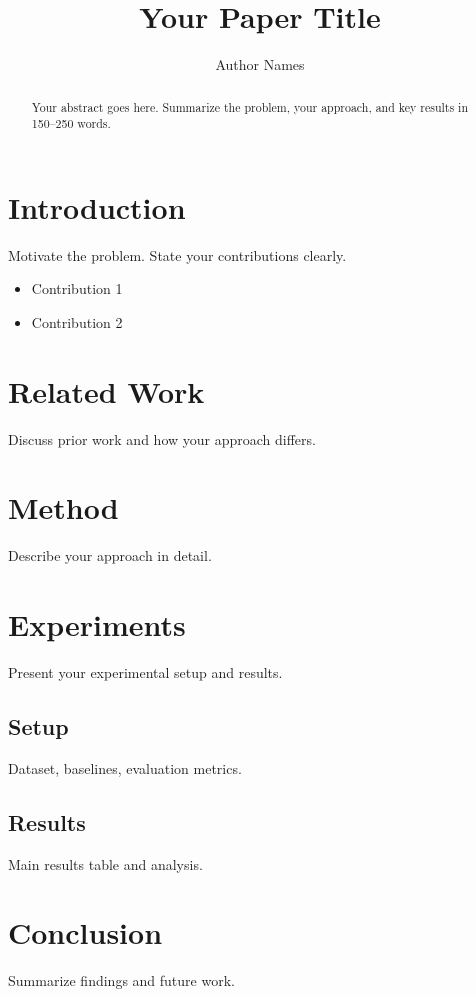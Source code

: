 \documentclass{article}
\title{Your Paper Title}
\author{Author Names}
\date{}
\begin{document}
\maketitle

\begin{abstract}
Your abstract goes here. Summarize the problem, your approach, and key results in 150--250 words.
\end{abstract}

\section{Introduction}
Motivate the problem. State your contributions clearly.

\begin{itemize}
    \item Contribution 1
    \item Contribution 2
\end{itemize}

\section{Related Work}
Discuss prior work and how your approach differs.

\section{Method}
Describe your approach in detail.

\section{Experiments}
Present your experimental setup and results.

\subsection{Setup}
Dataset, baselines, evaluation metrics.

\subsection{Results}
Main results table and analysis.

\section{Conclusion}
Summarize findings and future work.



\end{document}
